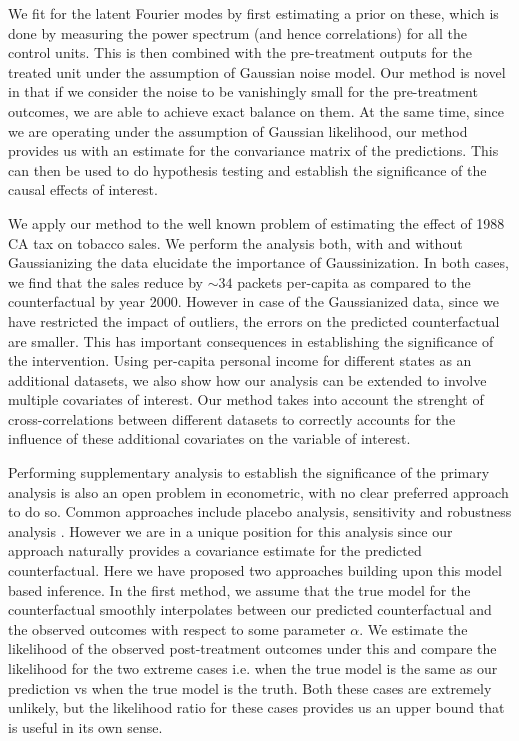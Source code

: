 \documentclass{article}
\begin{document}
We fit for the latent Fourier modes by first estimating a prior on these, which is done by measuring the power spectrum (and hence correlations) for all the control units. This is then combined with the pre-treatment outputs for the treated unit under the assumption of Gaussian noise model. Our method is novel in that if we consider the noise to be vanishingly small for the pre-treatment outcomes, we are able to achieve exact balance on them. At the same time, since we are operating under the assumption of Gaussian likelihood, our method provides us with an estimate for the convariance matrix of the predictions. This can then be used to do hypothesis testing and establish the significance of the causal effects of interest.

We apply our method to the well known problem of estimating the effect of 1988 CA tax on tobacco sales. We perform the analysis both, with and without Gaussianizing the data elucidate the importance of Gaussinization. In both cases, we find that the sales reduce by $\sim 34$ packets per-capita as compared to the counterfactual by year 2000. However in case of the Gaussianized data, since we have restricted the impact of outliers, the errors on the predicted counterfactual are smaller. This has important consequences in establishing the significance of the intervention. Using per-capita personal income for different states as an additional datasets, we also show how our analysis can be extended to involve multiple covariates of interest. Our method takes into account the strenght of cross-correlations between different datasets to correctly accounts for the influence of these additional covariates on the variable of interest. 


Performing supplementary analysis to establish the significance of the primary analysis is also an open problem in econometric, with no clear preferred approach to do so. Common approaches include placebo analysis, sensitivity and robustness analysis \cite{Abadie10, Athey2016}. However we are in a unique position for this analysis since our approach naturally provides a covariance estimate for the predicted counterfactual. Here we have proposed two approaches building upon this model based inference. In the first method, we assume that the true model for the counterfactual smoothly interpolates between our predicted counterfactual and the observed outcomes with respect to some parameter $\alpha$. We estimate the likelihood of the observed post-treatment outcomes under this and compare the likelihood for the two extreme cases i.e. when the true model is the same as our prediction vs when the true model is the truth. Both these cases are extremely unlikely, but the likelihood ratio for these cases provides us an upper bound that is useful in its own sense.
\end{document}
